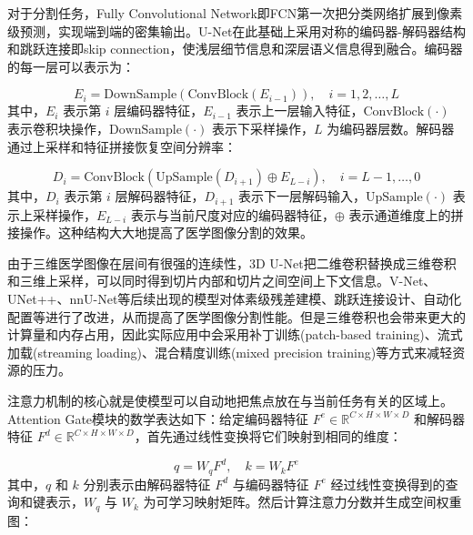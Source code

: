 对于分割任务，Fully Convolutional Network即FCN第一次把分类网络扩展到像素级预测，实现端到端的密集输出\cite{long2015}。U-Net在此基础上采用对称的编码器-解码器结构和跳跃连接即skip connection，使浅层细节信息和深层语义信息得到融合。编码器的每一层可以表示为：

\begin{equation}
    E_i = \text{DownSample}(\text{ConvBlock}(E_{i-1})), \quad i=1,2,\ldots,L
    \label{eq:unet-encoder}
\end{equation}
其中，$E_i$ 表示第 $i$ 层编码器特征，$E_{i-1}$ 表示上一层输入特征，$\text{ConvBlock}(\cdot)$ 表示卷积块操作，$\text{DownSample}(\cdot)$ 表示下采样操作，$L$ 为编码器层数。解码器通过上采样和特征拼接恢复空间分辨率：

\begin{equation}
    D_i = \text{ConvBlock}(\text{UpSample}(D_{i+1}) \oplus E_{L-i}), \quad i=L-1,\ldots,0
    \label{eq:unet-decoder}
\end{equation}
其中，$D_i$ 表示第 $i$ 层解码器特征，$D_{i+1}$ 表示下一层解码输入，$\text{UpSample}(\cdot)$ 表示上采样操作，$E_{L-i}$ 表示与当前尺度对应的编码器特征，$\oplus$ 表示通道维度上的拼接操作。这种结构大大地提高了医学图像分割的效果\cite{unet}。

由于三维医学图像在层间有很强的连续性，3D U-Net把二维卷积替换成三维卷积和三维上采样，可以同时得到切片内部和切片之间空间上下文信息\cite{unet3d,cciccek20163d}。V-Net、UNet++、nnU-Net等后续出现的模型对体素级残差建模、跳跃连接设计、自动化配置等进行了改进，从而提高了医学图像分割性能\cite{milletari2016,zhou2018unetpp,nnunet}。但是三维卷积也会带来更大的计算量和内存占用，因此实际应用中会采用补丁训练(patch-based training)、流式加载(streaming loading)、混合精度训练(mixed precision training)等方式来减轻资源的压力。


注意力机制的核心就是使模型可以自动地把焦点放在与当前任务有关的区域上。Attention Gate模块的数学表达如下：给定编码器特征 $F^e \in \mathbb{R}^{C \times H \times W \times D}$ 和解码器特征 $F^d \in \mathbb{R}^{C \times H \times W \times D}$，首先通过线性变换将它们映射到相同的维度：

\begin{equation}
    q = W_q F^d, \quad k = W_k F^e
    \label{eq:attention-qk}
\end{equation}
其中，$q$ 和 $k$ 分别表示由解码器特征 $F^d$ 与编码器特征 $F^e$ 经过线性变换得到的查询和键表示，$W_q$ 与 $W_k$ 为可学习映射矩阵。然后计算注意力分数并生成空间权重图：

